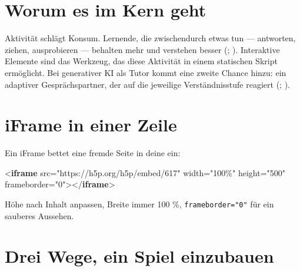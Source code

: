 \documentclass[
  ngerman,
  a4paper,
  DIV=11]{scrreprt}
\newenvironment{Shaded}{\begin{snugshade}}{\end{snugshade}}
\newcommand{\DataTypeTok}[1]{\textcolor[rgb]{0.68,0.00,0.00}{#1}}
\newcommand{\KeywordTok}[1]{\textcolor[rgb]{0.00,0.23,0.31}{\textbf{#1}}}
\newcommand{\OperatorTok}[1]{\textcolor[rgb]{0.37,0.37,0.37}{#1}}
\newcommand{\OtherTok}[1]{\textcolor[rgb]{0.00,0.23,0.31}{#1}}
\newcommand{\StringTok}[1]{\textcolor[rgb]{0.13,0.47,0.30}{#1}}
\begin{document}
\section{Worum es im Kern geht}\label{worum-es-im-kern-geht-4}

Aktivität schlägt Konsum. Lernende, die zwischendurch etwas tun ---
antworten, ziehen, ausprobieren --- behalten mehr und verstehen besser
(;
). Interaktive
Elemente sind das Werkzeug, das diese Aktivität in einem statischen
Skript ermöglicht. Bei generativer KI als Tutor kommt eine zweite Chance
hinzu: ein adaptiver Gesprächspartner, der auf die jeweilige
Verständnisstufe reagiert (; ).

\section{iFrame in einer Zeile}\label{iframe-in-einer-zeile}

Ein iFrame bettet eine fremde Seite in deine ein:

\begin{Shaded}
\begin{Highlighting}[]
\DataTypeTok{\textless{}}\KeywordTok{iframe}\OtherTok{ src}\OperatorTok{=}\StringTok{"https://h5p.org/h5p/embed/617"}\OtherTok{ width}\OperatorTok{=}\StringTok{"100\%"}\OtherTok{ height}\OperatorTok{=}\StringTok{"500"}\OtherTok{ frameborder}\OperatorTok{=}\StringTok{"0"}\DataTypeTok{\textgreater{}\textless{}/}\KeywordTok{iframe}\DataTypeTok{\textgreater{}}
\end{Highlighting}
\end{Shaded}

Höhe nach Inhalt anpassen, Breite immer 100 \%, \texttt{frameborder="0"}
für ein sauberes Aussehen.

\section{Drei Wege, ein Spiel
einzubauen}\label{drei-wege-ein-spiel-einzubauen}
\end{document}
